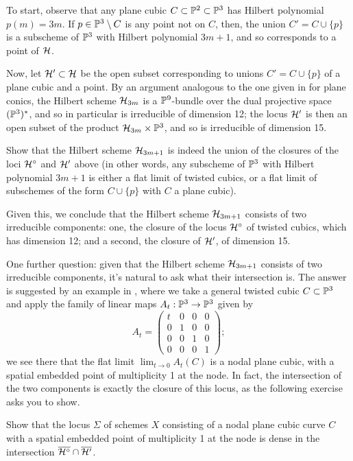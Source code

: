 To start, observe that any plane cubic $C \subset \PP^2 \subset \PP^3$ has Hilbert polynomial $p(m) = 3m$. If $p \in \PP^3 \setminus C$ is any point not on $C$, then, the union $C' = C \cup \{p\}$ is a subscheme of $\PP^3$ with Hilbert polynomial $3m+1$, and so corresponds to a point of $\cH$. 

Now, let $\cH' \subset \cH$ be the open subset corresponding to unions $C' = C \cup \{p\}$ of a plane cubic and a point. By an argument analogous to the one given in \cite{3264} for plane conics, the Hilbert scheme $\cH_{3m}$ is a $\PP^9$-bundle over the dual projective space $(\PP^3)^*$, and so in particular is irreducible of dimension 12; the locus $\cH'$ is then an open subset of the product $\cH_{3m} \times \PP^3$, and so is irreducible of dimension 15. 

\begin{exercise}
Show that the Hilbert scheme $\cH_{3m+1}$ is indeed the union of the closures of the loci $\cH^\circ$ and $\cH'$ above (in other words, any subscheme of $\PP^3$ with Hilbert polynomial $3m+1$ is either a flat limit of twisted cubics, or a flat limit of subschemes of the form $C \cup \{p\}$ with $C$ a plane cubic).
\end{exercise}

Given this, we conclude that the Hilbert scheme $\cH_{3m+1}$ consists of two irreducible components: one, the closure of the locus $\cH^\circ$ of twisted cubics, which has dimension 12; and a second, the closure of $\cH'$, of dimension 15.

One further question: given that the Hilbert scheme $\cH_{3m+1}$ consists of two irreducible components, it's natural to ask what their intersection is. The answer is suggested by an example in \cite[II.3.4]{GeomSchemes}, where we take a general twisted cubic  $C \subset \PP^3$ and apply the family of linear maps $A_t : \PP^3 \to \PP^3$ given by
$$
A_t =
\begin{pmatrix}
t & 0 & 0 & 0 \\
0 & 1 & 0 & 0 \\
0 & 0 & 1 & 0 \\
0 & 0 & 0 & 1
\end{pmatrix};
$$
we see there that the flat limit $\lim_{t \to 0} A_t(C)$ is a nodal plane cubic, with a spatial embedded point of multiplicity 1 at the node. In fact, the intersection of the two components is exactly the closure of this locus, as the following exercise asks you to show.


\begin{exercise}
Show that the locus $\Sigma$ of schemes $X$ consisting of a nodal plane cubic curve $C$ with a spatial embedded point of multiplicity 1 at the node is dense in the intersection $\overline{\cH^\circ} \cap \overline{\cH'}$.
\end{exercise}

